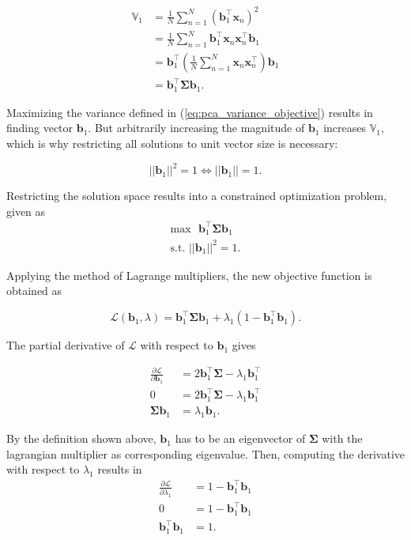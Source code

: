\documentclass[../../../main.tex]{subfiles}
\begin{document}
\begin{equation}\label{eq:pca_variance_objective}
    \begin{aligned}
        \mathbb{V}_1 &= \frac{1}{N}\sum\limits^N_{n=1}(\bm{b}_1^\top\bm{x}_n)^2 \\
        &= \frac{1}{N}\sum\limits^N_{n=1} \bm{b}_1^\top \bm{x}_n \bm{x}_n^\top \bm{b}_1 \\
        &= \bm{b}_1^\top(\frac{1}{N}\sum\limits^N_{n=1} \bm{x}_n \bm{x}_n^\top ) \bm{b}_1 \\
        &= \bm{b}_1^\top \bm{\Sigma} \bm{b}_1.
    \end{aligned}
\end{equation}

Maximizing the variance defined in (\ref{eq:pca_variance_objective}) results in finding vector $\bm{b}_1$. But arbitrarily increasing the magnitude of $\bm{b}_1$ increases $\mathbb{V}_1$, which is why restricting all solutions to unit vector size is necessary:

\begin{equation*}
    || \bm{b}_1 || ^2 = 1 \Leftrightarrow || \bm{b}_1 || = 1.
\end{equation*}

Restricting the solution space results into a constrained optimization problem, given as
\begin{align*}
    \mathrm{max} \text{ } \bm{b}_1^\top \bm{\Sigma} \bm{b}_1 \\
    \text{s.t. } || \bm{b}_1 ||^2 = 1.
\end{align*}

Applying the method of Lagrange multipliers, the new objective function is obtained as

\begin{equation*}
    \mathcal{L}(\bm{b}_1, \lambda) = \bm{b}_1^\top \bm{\Sigma} \bm{b}_1 + \lambda_1(1-\bm{b}_1^\top\bm{b}_1).
\end{equation*}

The partial derivative of $\mathcal{L}$ with respect to $\bm{b}_1$ gives

\begin{align*}
    \frac{\partial{\mathcal{L}}}{\partial{\bm{b}_1}} &= 2\bm{b}_1^\top \bm{\Sigma} - \lambda_1 \bm{b}_1^\top \\
    0 &= 2\bm{b}_1^\top \bm{\Sigma} - \lambda_1 \bm{b}_1^\top \\
    \bm{\Sigma} \bm{b}_1 &= \lambda_1 \bm{b}_1.
\end{align*}

By the definition shown above, $\bm{b}_1$ has to be an eigenvector of $\bm{\Sigma}$ with the lagrangian multiplier as corresponding eigenvalue. Then, computing the derivative with respect to $\lambda_1$ results in
\begin{align*}
    \frac{\partial{\mathcal{L}}}{\partial{\lambda_1}} &= 1 - \bm{b}_1^\top\bm{b}_1 \\
    0 &= 1 - \bm{b}_1^\top\bm{b}_1 \\
    \bm{b}_1^\top\bm{b}_1 &= 1.
\end{align*}
\end{document}
